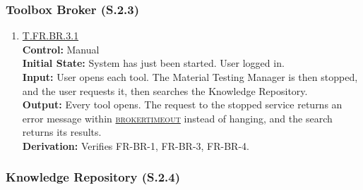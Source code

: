\documentclass[12pt, titlepage]{article}
\newcommand{\testdef}[1]{\leavevmode\hypertarget{test:#1}{}\hyperlink{trace:#1}{#1}}
\DeclareRobustCommand{\cname}[1]{{\renewcommand{\_}{\textunderscore\allowbreak}\textsc{#1}}}
\newcommand{\constfirst}[1]{\leavevmode\hypertarget{constfirst:\detokenize{#1}}{}\hyperlink{const:\detokenize{#1}}{\cname{#1}}}
\begin{document}
\subsubsection{Toolbox Broker (S.2.3)}

\begin{enumerate}

\item \testdef{T.FR.BR.3.1}\\
\textbf{Control:} Manual\\
\textbf{Initial State:} System has just been started. User logged in.\\
\textbf{Input:} User opens each tool. The Material Testing Manager is then
stopped, and the user requests it, then searches the Knowledge Repository.\\
\textbf{Output:} Every tool opens. The request to the stopped service returns an
error message within \constfirst{broker\_timeout} instead of hanging, and the search
returns its results.\\
\textbf{Derivation:} Verifies FR-BR-1, FR-BR-3, FR-BR-4.

\end{enumerate}

\subsubsection{Knowledge Repository (S.2.4)}
\end{document}
